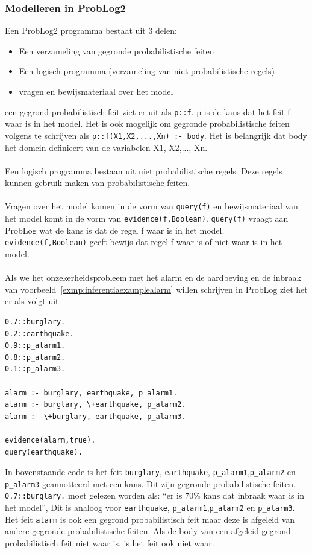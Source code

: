 \documentclass[12pt,a4paper,oneside]{book}
\theoremstyle{definition}
\newcommand{\quotes}[1]{``#1''}
\begin{document}
\subsubsection{Modelleren in ProbLog2}
\label{subsubsec:ModellereninProbLog2}
Een ProbLog2 programma bestaat uit 3 delen:
\begin{itemize}
	\item Een verzameling van gegronde probabilistische feiten
	\item Een logisch programma (verzameling van niet probabilistische regels)
	\item vragen en bewijsmateriaal over het model
\end{itemize}
een gegrond probabilistisch feit ziet er uit als \lstinline{p::f}. p is de kans dat het feit f waar is in het model. Het is ook mogelijk om gegronde probabilistische feiten volgens te schrijven als \lstinline{p::f(X1,X2,...,Xn) :- body}. Het is belangrijk dat body het domein definieert van de variabelen X1, X2,..., Xn.
\\\\
Een logisch programma bestaan uit niet probabilistische regels. Deze regels kunnen gebruik maken van probabilistische feiten.
\\\\
Vragen over het model komen in de vorm van \lstinline{query(f)} en bewijsmateriaal van het model komt in de vorm van \lstinline{evidence(f,Boolean)}. \lstinline{query(f)} vraagt aan ProbLog wat de kans is dat de regel f waar is in het model. \lstinline{evidence(f,Boolean)} geeft bewijs dat regel f waar is of niet waar is in het model.
\\\\
Als we het onzekerheidsprobleem met het alarm en de aardbeving en de inbraak van voorbeeld~\ref{exmp:inferentiaexamplealarm} willen schrijven in ProbLog ziet het er als volgt uit:
\begin{lstlisting}
0.7::burglary.
0.2::earthquake.
0.9::p_alarm1.
0.8::p_alarm2.
0.1::p_alarm3.

alarm :- burglary, earthquake, p_alarm1.
alarm :- burglary, \+earthquake, p_alarm2.
alarm :- \+burglary, earthquake, p_alarm3.

evidence(alarm,true).
query(earthquake).
\end{lstlisting}
In bovenstaande code is het feit \lstinline{burglary}, \lstinline{earthquake}, \lstinline{p_alarm1},\lstinline{p_alarm2} en \lstinline{p_alarm3} geannotteerd met een kans. Dit zijn gegronde probabilistische feiten. \lstinline{0.7::burglary.} moet gelezen worden als: \quotes{er is 70\% kans dat inbraak waar is in het model}, Dit is analoog voor \lstinline{earthquake}, \lstinline{p_alarm1},\lstinline{p_alarm2} en \lstinline{p_alarm3}. Het feit \lstinline{alarm} is ook een gegrond probabilistisch feit maar deze is afgeleid van andere gegronde probabilistische feiten. Als de body van een afgeleid gegrond probabilistisch feit niet waar is, is het feit ook niet waar.
\end{document}
